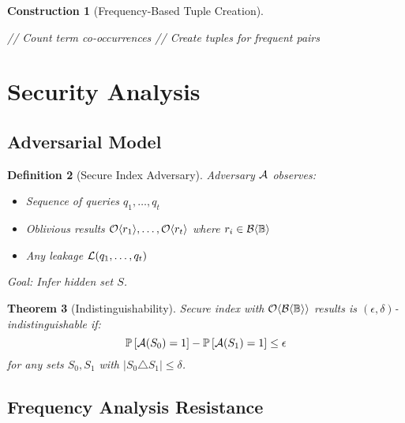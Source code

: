 \documentclass[11pt,final,hidelinks]{article}
\newcommand{\BernBool}{\mathcal{B}\langle \Bool \rangle}
\newtheorem{theorem}{Theorem}[section]
\newtheorem{definition}[theorem]{Definition}
\newtheorem{construction}[theorem]{Construction}
\begin{document}
\begin{construction}[Frequency-Based Tuple Creation]
\begin{algorithm}[H]
\caption{Adaptive Tuple Index Construction}
// Count term co-occurrences\;
// Create tuples for frequent pairs\;
\end{algorithm}
\end{construction}

\section{Security Analysis}

\subsection{Adversarial Model}

\begin{definition}[Secure Index Adversary]
Adversary $\mathcal{A}$ observes:
\begin{itemize}
    \item Sequence of queries $q_1, \ldots, q_t$
    \item Oblivious results $\mathcal{O}\langle r_1 \rangle, \ldots, \mathcal{O}\langle r_t \rangle$ where $r_i \in \BernBool$
    \item Any leakage $\mathcal{L}(q_1, \ldots, q_t)$
\end{itemize}
Goal: Infer hidden set $S$.
\end{definition}

\begin{theorem}[Indistinguishability]
Secure index with $\Obv{\BernBool}$ results is $(\epsilon, \delta)$-indistinguishable if:
\begin{equation}
\mathbb{P}\left[\mathcal{A}(S_0) = 1\right] - \mathbb{P}\left[\mathcal{A}(S_1) = 1\right] \leq \epsilon
\end{equation}
for any sets $S_0, S_1$ with $|S_0 \triangle S_1| \leq \delta$.
\end{theorem}

\subsection{Frequency Analysis Resistance}
\end{document}
